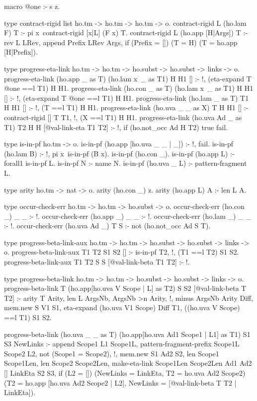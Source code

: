 \begin{elpicode}
  
  macro @one :- s z.

  type contract-rigid list ho.tm -> ho.tm -> ho.tm -> o.
  contract-rigid L (ho.lam F) T :- 
    pi x\ contract-rigid [x|L] (F x) T. %
  contract-rigid L (ho.app [H|Args]) T :- 
    rev L LRev, append Prefix LRev Args,
    if (Prefix = []) (T = H) (T = ho.app [H|Prefix]).

  type progress-eta-link ho.tm -> ho.tm -> ho.subst -> ho.subst -> links -> o.
  progress-eta-link (ho.app _ as T) (ho.lam x\ _ as T1) H H1 [] :- !, 
    ({eta-expand T @one} ==l T1) H H1.
  progress-eta-link (ho.con _ as T) (ho.lam x\ _ as T1) H H1 [] :- !, 
    ({eta-expand T @one} ==l T1) H H1.
  progress-eta-link (ho.lam _ as T) T1 H H1 [] :- !, 
    (T ==l T1) H H1.
  progress-eta-link (ho.uva _ _ as X) T H H1 [] :- 
    contract-rigid [] T T1, !, (X ==l T1) H H1.
  progress-eta-link (ho.uva Ad _ as T1) T2 H H [@val-link-eta T1 T2] :- !, 
    if (ho.not_occ Ad H T2) true fail.

  type is-in-pf ho.tm -> o.
  is-in-pf (ho.app [ho.uva _ _ | _]) :- !, fail.
  is-in-pf (ho.lam B) :- !, pi x\ is-in-pf (B x).
  is-in-pf (ho.con _).
  is-in-pf (ho.app L) :- forall1 is-in-pf L.
  is-in-pf N :- name N.
  is-in-pf (ho.uva _ L) :- pattern-fragment L.

  type arity ho.tm -> nat -> o.
  arity (ho.con _) z.
  arity (ho.app L) A :- len L A.

  type occur-check-err ho.tm -> ho.tm -> ho.subst -> o.
  occur-check-err (ho.con _) _ _ :- !.
  occur-check-err (ho.app _) _ _ :- !.
  occur-check-err (ho.lam _) _ _ :- !.
  occur-check-err (ho.uva Ad _) T S :-
    not (ho.not_occ Ad S T).

  type progress-beta-link-aux ho.tm -> ho.tm -> 
          ho.subst -> ho.subst -> links -> o.
  progress-beta-link-aux T1 T2 S1 S2 [] :-  is-in-pf T2, !,
    (T1 ==l T2) S1 S2.
  progress-beta-link-aux T1 T2 S S [@val-link-beta T1 T2] :- !.

  type progress-beta-link ho.tm -> ho.tm -> ho.subst -> 
        ho.subst -> links -> o.
  progress-beta-link T (ho.app[ho.uva V Scope | L] as T2) S S2 [@val-link-beta T T2] :- 
    arity T Arity, len L ArgsNb, ArgsNb >n Arity, !,
    minus ArgsNb Arity Diff, mem.new S V1 S1,
    eta-expand (ho.uva V1 Scope) Diff T1,
    ((ho.uva V Scope) ==l T1) S1 S2.

  progress-beta-link (ho.uva _ _ as T) (ho.app[ho.uva Ad1 Scope1 | L1] as T1) S1 S3 NewLinks :-
    append Scope1 L1 Scope1L,
    pattern-fragment-prefix Scope1L Scope2 L2,
    not (Scope1 = Scope2), !,
    mem.new S1 Ad2 S2,
    len Scope1 Scope1Len,
    len Scope2 Scope2Len,
    make-eta-link Scope1Len Scope2Len Ad1 Ad2 [] LinkEta S2 S3,
    if (L2 = []) (NewLinks = LinkEta, T2 = ho.uva Ad2 Scope2) 
      (T2 = ho.app [ho.uva Ad2 Scope2 | L2], 
      NewLinks = [@val-link-beta T T2 | LinkEta]).


\end{elpicode}
